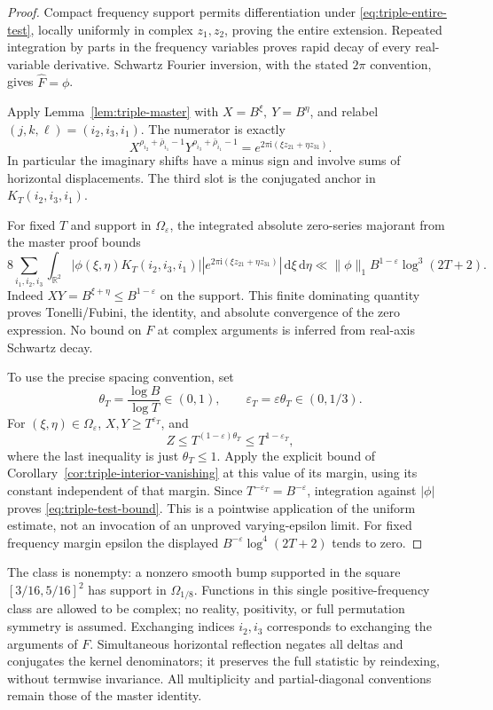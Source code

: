 \documentclass[11pt]{article}
\newcommand{\ii}{\mathrm i}
\newcommand{\dd}{\,\mathrm d}
\begin{document}
\begin{proof}
Compact frequency support permits differentiation under
\eqref{eq:triple-entire-test}, locally uniformly in complex \(z_1,z_2\),
proving the entire extension. Repeated integration by parts in the
frequency variables proves rapid decay of every real-variable derivative.
Schwartz Fourier inversion, with the stated \(2\pi\) convention, gives
\(\widehat F=\phi\).

Apply Lemma~\ref{lem:triple-master} with
\(X=B^\xi,\ Y=B^\eta\), and relabel \((j,k,\ell)=(i_2,i_3,i_1)\).
The numerator is exactly
\[
 X^{\rho_{i_2}+\bar\rho_{i_1}-1}
 Y^{\rho_{i_3}+\bar\rho_{i_1}-1}
 =e^{2\pi\ii(\xi z_{21}+\eta z_{31})}.
\]
In particular the imaginary shifts have a minus sign and involve sums
of horizontal displacements. The third slot is the conjugated anchor
in \(K_T(i_2,i_3,i_1)\).

For fixed \(T\) and support in \(\Omega_\varepsilon\), the integrated
absolute zero-series majorant from the master proof bounds
\[
 8\sum_{i_1,i_2,i_3}\int_{\mathbb R^2}
 |\phi(\xi,\eta)K_T(i_2,i_3,i_1)|
 \left|e^{2\pi\ii(\xi z_{21}+\eta z_{31})}\right|
 \dd\xi\dd\eta
 \ll \|\phi\|_1 B^{1-\varepsilon}\log^3(2T+2).
\]
Indeed \(XY=B^{\xi+\eta}\leq B^{1-\varepsilon}\) on the support.
This finite dominating quantity proves Tonelli/Fubini, the identity,
and absolute convergence of the zero expression. No bound on \(F\)
at complex arguments is inferred from real-axis Schwartz decay.

To use the precise spacing convention, set
\[
 \theta_T=\frac{\log B}{\log T}\in(0,1),\qquad
 \varepsilon_T=\varepsilon\theta_T\in(0,1/3).
\]
For \((\xi,\eta)\in\Omega_\varepsilon\), \(X,Y\geq
T^{\varepsilon_T}\), and
\[
 Z\leq T^{(1-\varepsilon)\theta_T}
       \leq T^{1-\varepsilon_T},
\]
where the last inequality is just \(\theta_T\leq1\).
Apply the explicit bound of
Corollary~\ref{cor:triple-interior-vanishing} at this value of its
margin, using its constant independent of that margin. Since
\(T^{-\varepsilon_T}=B^{-\varepsilon}\), integration against
\(|\phi|\) proves \eqref{eq:triple-test-bound}.
This is a pointwise application of the uniform estimate, not an
invocation of an unproved varying-epsilon limit. For fixed frequency
margin epsilon the displayed \(B^{-\varepsilon}\log^4(2T+2)\) tends to zero.
\end{proof}

The class is nonempty: a nonzero smooth bump supported in the square
\([3/16,5/16]^2\) has support in \(\Omega_{1/8}\).
Functions in this single positive-frequency class are allowed to be
complex; no reality, positivity, or full permutation symmetry is assumed.
Exchanging indices \(i_2,i_3\) corresponds to exchanging the arguments
of \(F\). Simultaneous horizontal reflection negates all deltas and
conjugates the kernel denominators; it preserves the full statistic
by reindexing, without termwise invariance. All multiplicity and
partial-diagonal conventions remain those of the master identity.
\end{document}

